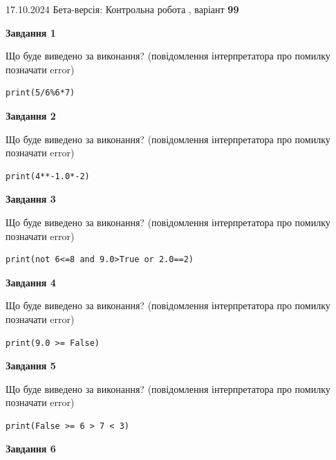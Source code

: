 \documentclass[12pt, ukrainian]{article}
\begin{document}
{\Large{17.10.2024 Бета-версія: Контрольна робота , варіант  \No \textbf { 99 }\par}}
{
\begin {large}
{\begin {center}\textbf{Завдання 1}\end {center}}

Що буде виведено за виконання? (повідомлення інтерпретатора про помилку позначати error)\par
\begin{verbatim}
print(5/6%6*7)
\end{verbatim}

{\begin {center}\textbf{Завдання 2}\end {center}}

Що буде виведено за виконання? (повідомлення інтерпретатора про помилку позначати error)\par
\begin{verbatim}
print(4**-1.0*-2)
\end{verbatim}

{\begin {center}\textbf{Завдання 3}\end {center}}

Що буде виведено за виконання? (повідомлення інтерпретатора про помилку позначати error)\par
\begin{verbatim}
print(not 6<=8 and 9.0>True or 2.0==2)
\end{verbatim}

{\begin {center}\textbf{Завдання 4}\end {center}}

Що буде виведено за виконання? (повідомлення інтерпретатора про помилку позначати error)\par
\begin{verbatim}
print(9.0 >= False)
\end{verbatim}

{\begin {center}\textbf{Завдання 5}\end {center}}

Що буде виведено за виконання? (повідомлення інтерпретатора про помилку позначати error)\par
\begin{verbatim}
print(False >= 6 > 7 < 3)
\end{verbatim}

{\begin {center}\textbf{Завдання 6}\end {center}}


\end{large}}
\end{document}
